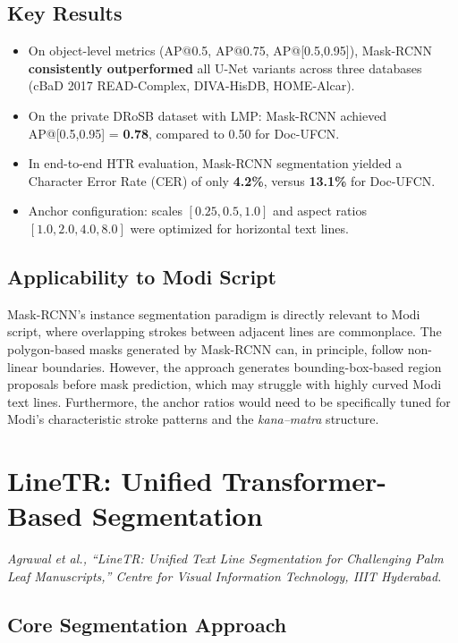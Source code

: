 \documentclass[11pt, a4paper]{article}
\begin{document}
\subsection{Key Results}

\begin{itemize}[leftmargin=1.5em]
    \item On object-level metrics (AP@0.5, AP@0.75, AP@[0.5,0.95]), Mask-RCNN \textbf{consistently outperformed} all U-Net variants across three databases (cBaD 2017 READ-Complex, DIVA-HisDB, HOME-Alcar).
    \item On the private DRoSB dataset with LMP: Mask-RCNN achieved AP@[0.5,0.95] = \textbf{0.78}, compared to 0.50 for Doc-UFCN.
    \item In end-to-end HTR evaluation, Mask-RCNN segmentation yielded a Character Error Rate (CER) of only \textbf{4.2\%}, versus \textbf{13.1\%} for Doc-UFCN.
    \item Anchor configuration: scales $[0.25, 0.5, 1.0]$ and aspect ratios $[1.0, 2.0, 4.0, 8.0]$ were optimized for horizontal text lines.
\end{itemize}

\subsection{Applicability to Modi Script}

Mask-RCNN's instance segmentation paradigm is directly relevant to Modi script, where overlapping strokes between adjacent lines are commonplace. The polygon-based masks generated by Mask-RCNN can, in principle, follow non-linear boundaries. However, the approach generates bounding-box-based region proposals before mask prediction, which may struggle with highly curved Modi text lines. Furthermore, the anchor ratios would need to be specifically tuned for Modi's characteristic stroke patterns and the \textit{kana--matra} structure.


\section{LineTR: Unified Transformer-Based Segmentation}
\label{sec:linetr}

\noindent\textit{Agrawal et al., ``LineTR: Unified Text Line Segmentation for Challenging Palm Leaf Manuscripts,'' Centre for Visual Information Technology, IIIT Hyderabad.}

\subsection{Core Segmentation Approach}
\end{document}
